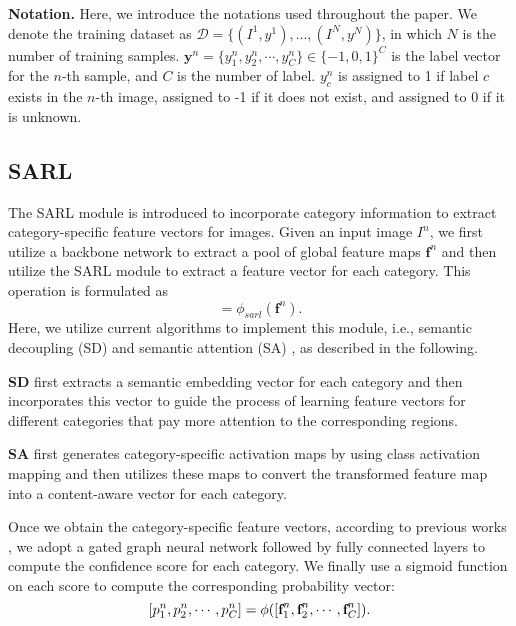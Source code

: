 \noindent\textbf{Notation. }Here, we introduce the notations used throughout the paper. We denote the training dataset as $\mathcal{D}=\{(I^1,y^1), ..., (I^N,y^N)\}$, in which $N$ is the number of training samples. $\textbf{y}^n=\{y^n_1, y^n_2, \cdots, y^n_C\}\in \{-1, 0, 1\}^C$ is the label vector for the $n$-th sample, and $C$ is the number of label. $y^n_c$ is assigned to 1 if label $c$ exists in the $n$-th image, assigned to -1 if it does not exist, and assigned to 0 if it is unknown.

\subsection{SARL}
\label{sec:sarl}
The SARL module is introduced to incorporate category information to extract category-specific feature vectors for images. Given an input image $I^n$, we first utilize a backbone network to extract a pool of global feature maps $\textbf{f}^n$ and then utilize the SARL module to extract a feature vector for each category. This operation is formulated as
\begin{equation}
 [\textbf{f}^n_1, \textbf{f}^n_2, \cdots, \textbf{f}^n_C]=\phi_{sarl}(\textbf{f}^n).
\end{equation}
Here, we utilize current algorithms to implement this module, i.e., semantic decoupling (SD) \cite{chen2019learning} and semantic attention (SA) \cite{Ye2020ADD-GCN}, as described in the following.

\noindent\textbf{SD} first extracts a semantic embedding vector for each category and then incorporates this vector to guide the process of learning feature vectors for different categories that pay more attention to the corresponding regions.

\noindent\textbf{SA} first generates category-specific activation maps by using class activation mapping \cite{Zhou2016CAM} and then utilizes these maps to convert the transformed feature map into a content-aware vector for each category.

\noindent Once we obtain the category-specific feature vectors, according to previous works \cite{chen2019learning,Ye2020ADD-GCN}, we adopt a gated graph neural network followed by fully connected layers to compute the confidence score for each category. We finally use a sigmoid function on each score to compute the corresponding probability vector:
\begin{equation}
 \centering
  [p^n_1, p^n_2, \cdots, p^n_C]=\phi([\textbf{f}^n_1, \textbf{f}^n_2, \cdots, \textbf{f}^n_C]).
\end{equation}

